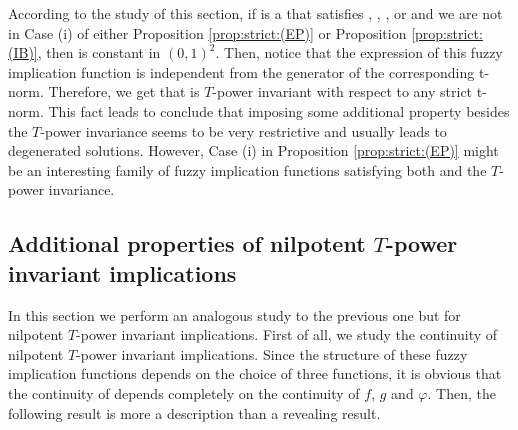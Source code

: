 \begin{remark}\label{remark:strictrestrictive}
	According to the study of this section, if \IT is a \STP that satisfies \CB, \NP, \EP, \IB or \LI and we are not in Case (i) of either Proposition \ref{prop:strict:(EP)} or Proposition \ref{prop:strict:(IB)}, then \IT is constant in $(0,1)^2$. Then, notice that the expression of this fuzzy implication function is independent from the generator of the corresponding t-norm. Therefore, we get that \IT is $T$-power invariant with respect to any strict t-norm. This fact leads to conclude that imposing some additional property besides the $T$-power invariance seems to be very restrictive and usually leads to degenerated solutions. However, Case (i) in Proposition \ref{prop:strict:(EP)} might be an interesting family of fuzzy implication functions satisfying both \EP and the $T$-power invariance.
\end{remark}
\subsection{Additional properties of nilpotent $T$-power invariant implications}\label{subsection:additional_propertiesNilpotentTpower}

In this section we perform an analogous study to the previous one but for  nilpotent $T$-power invariant implications. First of all, we study the continuity of nilpotent $T$-power invariant implications. Since the structure of these fuzzy implication functions depends on the choice of three functions, it is obvious that the continuity of \IT depends completely on the continuity of $f$, $g$ and $\varphi$. Then, the following result is more a description than a revealing result.

